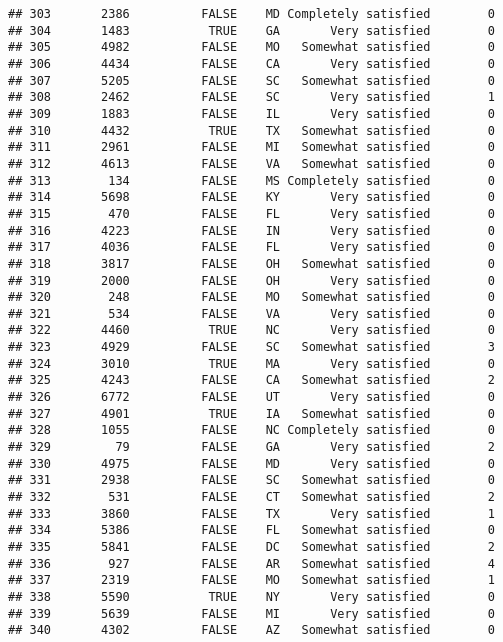\documentclass[]{book}
\theoremstyle{definition}
\theoremstyle{definition}
\theoremstyle{remark}
\begin{document}
\begin{verbatim}
## 303       2386          FALSE    MD Completely satisfied        0
## 304       1483           TRUE    GA       Very satisfied        0
## 305       4982          FALSE    MO   Somewhat satisfied        0
## 306       4434          FALSE    CA       Very satisfied        0
## 307       5205          FALSE    SC   Somewhat satisfied        0
## 308       2462          FALSE    SC       Very satisfied        1
## 309       1883          FALSE    IL       Very satisfied        0
## 310       4432           TRUE    TX   Somewhat satisfied        0
## 311       2961          FALSE    MI   Somewhat satisfied        0
## 312       4613          FALSE    VA   Somewhat satisfied        0
## 313        134          FALSE    MS Completely satisfied        0
## 314       5698          FALSE    KY       Very satisfied        0
## 315        470          FALSE    FL       Very satisfied        0
## 316       4223          FALSE    IN       Very satisfied        0
## 317       4036          FALSE    FL       Very satisfied        0
## 318       3817          FALSE    OH   Somewhat satisfied        0
## 319       2000          FALSE    OH       Very satisfied        0
## 320        248          FALSE    MO   Somewhat satisfied        0
## 321        534          FALSE    VA       Very satisfied        0
## 322       4460           TRUE    NC       Very satisfied        0
## 323       4929          FALSE    SC   Somewhat satisfied        3
## 324       3010           TRUE    MA       Very satisfied        0
## 325       4243          FALSE    CA   Somewhat satisfied        2
## 326       6772          FALSE    UT       Very satisfied        0
## 327       4901           TRUE    IA   Somewhat satisfied        0
## 328       1055          FALSE    NC Completely satisfied        0
## 329         79          FALSE    GA       Very satisfied        2
## 330       4975          FALSE    MD       Very satisfied        0
## 331       2938          FALSE    SC   Somewhat satisfied        0
## 332        531          FALSE    CT   Somewhat satisfied        2
## 333       3860          FALSE    TX       Very satisfied        1
## 334       5386          FALSE    FL   Somewhat satisfied        0
## 335       5841          FALSE    DC   Somewhat satisfied        2
## 336        927          FALSE    AR   Somewhat satisfied        4
## 337       2319          FALSE    MO   Somewhat satisfied        1
## 338       5590           TRUE    NY       Very satisfied        0
## 339       5639          FALSE    MI       Very satisfied        0
## 340       4302          FALSE    AZ   Somewhat satisfied        0

\end{verbatim}
\end{document}
